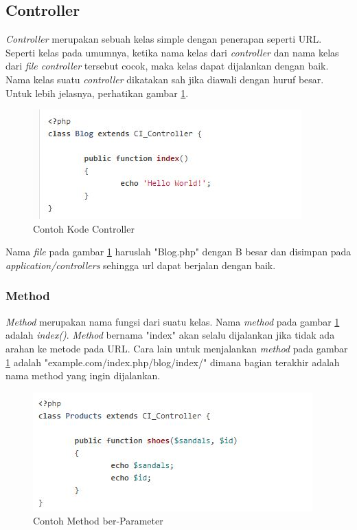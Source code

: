 \subsection{Controller}
\label{sub: controller}

	\textit{Controller} merupakan sebuah kelas simple dengan penerapan seperti URL. Seperti kelas pada umumnya, ketika nama kelas dari \textit{controller} dan nama kelas dari \textit{file controller} tersebut cocok, maka kelas dapat dijalankan dengan baik. Nama kelas suatu \textit{controller} dikatakan sah jika diawali dengan huruf besar. Untuk lebih jelasnya, perhatikan gambar \ref{fig:controller}.
	
		\begin{figure}[H]
			\centering
			\includegraphics[scale=1]{Gambar/controller}
			\caption{Contoh Kode Controller}
			\label{fig:controller}
		\end{figure}

	Nama \textit{file} pada gambar \ref{fig:controller} haruslah  "Blog.php" dengan B besar dan disimpan pada \textit{application/controllers} sehingga url dapat berjalan dengan baik.
	
\subsubsection{Method}
\label{subsub: method}

	\textit{Method} merupakan nama fungsi dari suatu kelas. Nama \textit{method} pada gambar \ref{fig:controller} adalah \textit{index()}. \textit{Method} bernama "index" akan selalu dijalankan jika tidak ada arahan ke metode pada URL. Cara lain untuk menjalankan \textit{method} pada gambar \ref{fig:controller} adalah "example.com/index.php/blog/index/" dimana bagian terakhir adalah nama method yang ingin dijalankan.
	
	
	\begin{figure}[H]
		\centering
		\includegraphics[scale=1]{Gambar/methode}
		\caption{Contoh Method ber-Parameter}
		\label{fig:method}
	\end{figure}
	
